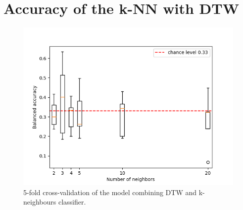 \section{Accuracy of the k-NN with DTW}

\begin{figure}
    \centering
    \includegraphics{img/5-fold_knn_scores.png}
    \caption{5-fold cross-validation of the model combining DTW and k-neighbours classifier.}
    \label{knn_5_fold}
\end{figure}